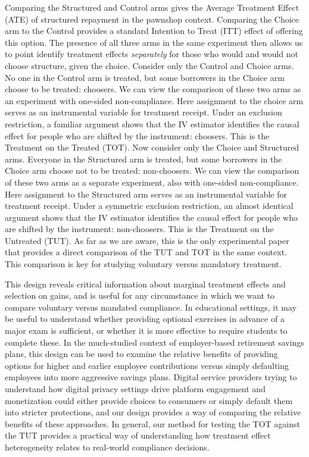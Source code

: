\documentclass[12pt, a4paper, colorinlistoftodos]{article}
\begin{document}
Comparing the Structured and Control arms gives the Average Treatment Effect (ATE) of structured repayment in the pawnshop context.  Comparing the Choice arm to the Control provides a standard Intention to Treat (ITT) effect of offering this option.  The presence of all three arms in the same experiment then allows us to point identify treatment effects \emph{separately} for those who would and would not choose structure, given the choice.  Consider only the Control and Choice arms. No one in the Control arm is treated, but some borrowers in the Choice arm choose to be treated: choosers. We can view the comparison of these two arms as an experiment with one-sided non-compliance. Here assignment to the choice arm serves as an instrumental variable for treatment receipt. Under an exclusion restriction, a familiar argument shows that the IV estimator identifies the causal effect for people who are shifted by the instrument: choosers. This is the Treatment on the Treated (TOT).  Now consider only the Choice and Structured arms. Everyone in the Structured arm is treated, but some borrowers in the Choice arm choose not to be treated: non-choosers. We can view the comparison of these two arms as a separate experiment, also with one-sided non-compliance. Here assignment to the Structured arm serves as an instrumental variable for treatment receipt. Under a symmetric exclusion restriction, an almost identical argument shows that the IV estimator identifies the causal effect for people who are shifted by the instrument: non-choosers. This is the Treatment on the Untreated (TUT).  As far as we are aware, this is the only experimental paper that provides a direct comparison of the TUT and TOT in the same context.  This comparison is key for studying voluntary versus mandatory treatment.


This design reveals critical information about marginal treatment effects and selection on gains, and is useful for any circumstance in which we want to compare voluntary versus mandated compliance.  In educational settings, it may be useful to understand whether providing optional exercises in advance of a major exam is sufficient, or whether it is more effective to require students to complete these.  In the much-studied context of employer-based retirement savings plans, this design can be used to examine the relative benefits of providing options for higher and earlier employee contributions versus simply defaulting employees into more aggressive savings plans.  Digital service providers trying to understand how digital privacy settings drive platform engagement and monetization could either provide choices to consumers or simply default them into stricter protections, and our design provides a way of comparing the relative benefits of these approaches.  In general, our method for testing the TOT against the TUT provides a practical way of understanding how treatment effect heterogeneity relates to real-world compliance decisions.
\end{document}
